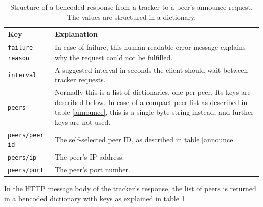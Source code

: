 \documentclass[10pt, a4paper, twoside, headsepline]{scrbook}
\renewcommand{\_}{\origunderscore\allowbreak}
\begin{document}
\begin{table}
\centering
\begin{tabularx}{\textwidth}{lX}
\toprule
Key & Explanation \\
\midrule
\texttt{failure reason} & In case of failure, this human-readable error message explains why the request could not be fulfilled. \\
\texttt{interval} & A suggested interval in seconds the client should wait between tracker requests. \\
\texttt{peers} & Normally this is a list of dictionaries, one per peer. Its keys are described below. In case of a compact peer list as described in table \ref{announce}, this is a single byte string instead, and further keys are not used. \\
\texttt{peers/peer id} & The self-selected peer ID, as described in table \ref{announce}. \\
\texttt{peers/ip} & The peer's IP address. \\
\texttt{peers/port} & The peer's port number. \\
\bottomrule
\end{tabularx}
\caption[A tracker's response to an announce request]{Structure of a bencoded response from a tracker to a peer's announce request. The values are structured in a dictionary.}
\label{announce-response}
\end{table}

In the HTTP message body of the tracker's response, the list of peers is returned in a bencoded dictionary with keys as explained in table \ref{announce-response}.
\end{document}
